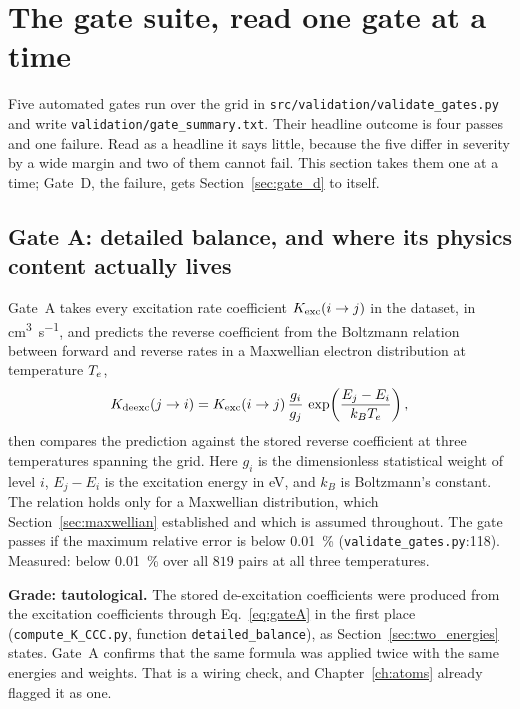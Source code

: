 \section{The gate suite, read one gate at a time}
\label{sec:gates_abc}

Five automated gates run over the grid in \texttt{src/validation/validate\_gates.py}
and write \texttt{validation/gate\_summary.txt}. Their headline outcome is four
passes and one failure. Read as a headline it says little, because the five
differ in severity by a wide margin and two of them cannot fail. This section
takes them one at a time; Gate~D, the failure, gets
Section~\ref{sec:gate_d} to itself.

\subsection{Gate A: detailed balance, and where its physics content actually
lives}

Gate~A takes every excitation rate coefficient $K_{\rm exc}(i\to j)$ in the
dataset, in \si{\cubic\centi\metre\per\second}, and predicts the reverse
coefficient from the Boltzmann relation between forward and reverse rates in a
Maxwellian electron distribution at temperature $T_e$,
\begin{equation}
  K_{\rm deexc}(j\to i)
  = K_{\rm exc}(i\to j)\,\frac{g_i}{g_j}\,
    \exp\!\left(\frac{E_j - E_i}{k_BT_e}\right),
  \label{eq:gateA}
\end{equation}
then compares the prediction against the stored reverse coefficient at three
temperatures spanning the grid. Here $g_i$ is the dimensionless statistical
weight of level $i$, $E_j-E_i$ is the excitation energy in
\si{\electronvolt}, and $k_B$ is Boltzmann's constant. The relation holds only
for a Maxwellian distribution, which Section~\ref{sec:maxwellian} established
and which is assumed throughout. The gate passes
if the maximum relative error is below \SI{0.01}{\percent}
(\texttt{validate\_gates.py}:118). Measured: below \SI{0.01}{\percent} over all
$819$ pairs at all three temperatures.

\textbf{Grade: tautological.} The stored de-excitation coefficients were
produced from the excitation coefficients through Eq.~\eqref{eq:gateA} in the
first place (\texttt{compute\_K\_CCC.py}, function \texttt{detailed\_balance}),
as Section~\ref{sec:two_energies} states. Gate~A confirms that the same formula
was applied twice with the same energies and weights. That is a wiring check,
and Chapter~\ref{ch:atoms} already flagged it as one.

